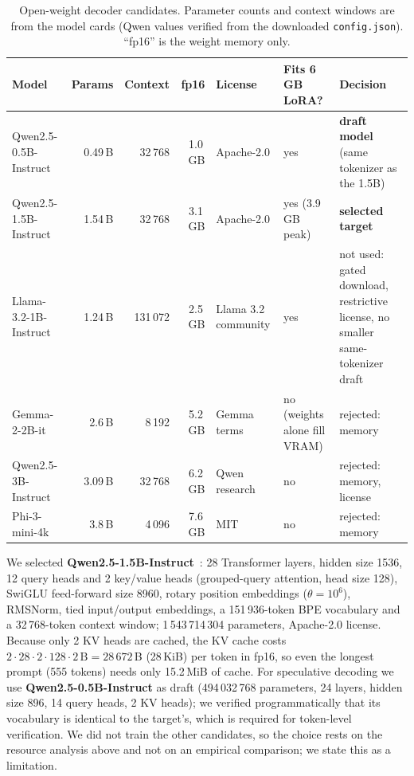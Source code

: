 \begin{table}[t]
\caption{Open-weight decoder candidates. Parameter counts and context windows are from the model cards (Qwen values verified from the downloaded \texttt{config.json}). ``fp16'' is the weight memory only.}
\label{tab:models}
\centering\footnotesize
\begin{tabular}{lrrrllp{3.6cm}}
\hline
Model & Params & Context & fp16 & License & Fits 6\,GB LoRA? & Decision \\
\hline
Qwen2.5-0.5B-Instruct & 0.49\,B & 32\,768 & 1.0\,GB & Apache-2.0 & yes & \textbf{draft model} (same tokenizer as the 1.5B) \\
Qwen2.5-1.5B-Instruct & 1.54\,B & 32\,768 & 3.1\,GB & Apache-2.0 & yes (3.9\,GB peak) & \textbf{selected target} \\
Llama-3.2-1B-Instruct~\cite{meta2024llama32} & 1.24\,B & 131\,072 & 2.5\,GB & Llama 3.2 community & yes & not used: gated download, restrictive license, no smaller same-tokenizer draft \\
Gemma-2-2B-it~\cite{gemma2024gemma2} & 2.6\,B & 8\,192 & 5.2\,GB & Gemma terms & no (weights alone fill VRAM) & rejected: memory \\
Qwen2.5-3B-Instruct & 3.09\,B & 32\,768 & 6.2\,GB & Qwen research & no & rejected: memory, license \\
Phi-3-mini-4k~\cite{abdin2024phi3} & 3.8\,B & 4\,096 & 7.6\,GB & MIT & no & rejected: memory \\
\hline
\end{tabular}
\end{table}

We selected \textbf{Qwen2.5-1.5B-Instruct}~\cite{qwen2024qwen25}: 28 Transformer layers, hidden size 1536, 12 query heads and 2 key/value heads (grouped-query attention, head size 128), SwiGLU feed-forward size 8960, rotary position embeddings ($\theta=10^6$), RMSNorm, tied input/output embeddings, a 151\,936-token BPE vocabulary and a 32\,768-token context window; 1\,543\,714\,304 parameters, Apache-2.0 license. Because only 2 KV heads are cached, the KV cache costs $2\cdot 28\cdot 2\cdot 128\cdot 2\,\text{B}=28\,672$\,B (28\,KiB) per token in fp16, so even the longest prompt (555 tokens) needs only 15.2\,MiB of cache. For speculative decoding we use \textbf{Qwen2.5-0.5B-Instruct} as draft (494\,032\,768 parameters, 24 layers, hidden size 896, 14 query heads, 2 KV heads); we verified programmatically that its vocabulary is identical to the target's, which is required for token-level verification. We did not train the other candidates, so the choice rests on the resource analysis above and not on an empirical comparison; we state this as a limitation.

